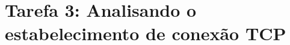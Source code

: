 \section*{Tarefa 3: Analisando o estabelecimento de conexão TCP}

\begin{questions}
    
    
\end{questions}